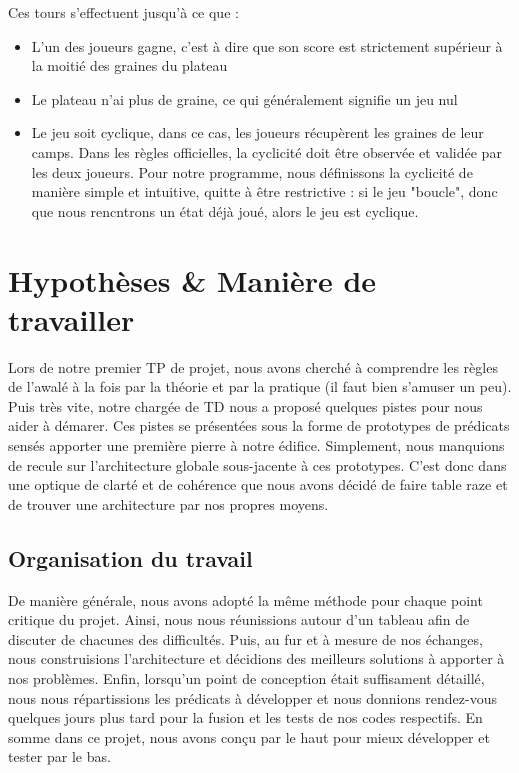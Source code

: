 \documentclass[]{article}
\begin{document}
Ces tours s'effectuent jusqu'à ce que :
\begin{itemize}
\item L'un des joueurs gagne, c'est à dire que son score est strictement supérieur à la moitié des graines du plateau
\item Le plateau n'ai plus de graine, ce qui généralement signifie un jeu nul
\item Le jeu soit cyclique, dans ce cas, les joueurs récupèrent les graines de leur camps. Dans les règles officielles, la cyclicité doit être observée et validée par les deux joueurs. Pour notre programme, nous définissons la cyclicité de manière simple et intuitive, quitte à être restrictive : si le jeu "boucle", donc que nous rencntrons un état déjà joué, alors le jeu est cyclique.
\end{itemize}



\section{Hypothèses \& Manière de travailler}

	Lors de notre premier TP de projet, nous avons cherché à comprendre les règles de l'awalé à la fois par la théorie et par la pratique (il faut bien s'amuser un peu).
Puis très vite, notre chargée de TD nous a proposé quelques pistes pour nous aider à démarer. Ces pistes se présentées sous la forme de prototypes de prédicats sensés apporter une première pierre à notre édifice.
Simplement, nous manquions de recule sur l'architecture globale sous-jacente à ces prototypes. C'est donc dans une optique de clarté et de cohérence que nous avons décidé de faire table raze et de trouver une architecture par nos propres moyens.

\subsection{Organisation du travail}

	De manière générale, nous avons adopté la même méthode pour chaque point critique du projet.
Ainsi, nous nous réunissions autour d'un tableau afin de discuter de chacunes des difficultés. Puis, au fur et à mesure de nos échanges, nous construisions l'architecture et décidions des meilleurs solutions à apporter à nos problèmes.
Enfin, lorsqu'un point de conception était suffisament détaillé, nous nous répartissions les prédicats à développer et nous donnions rendez-vous quelques jours plus tard pour la fusion et les tests de nos codes respectifs.
En somme dans ce projet, nous avons conçu par le haut pour mieux développer et tester par le bas.
\end{document}

